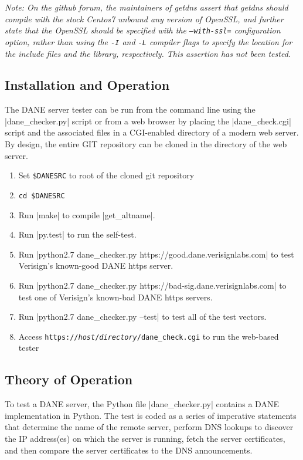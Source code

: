 \documentclass[preprint,3p]{elsarticle}
\begin{document}
\emph{Note: On the github forum, the maintainers of getdns assert that
getdns should compile with the stock Centos7 unbound any version of
OpenSSL, and further state that the OpenSSL should be specified with
the \texttt{--with-ssl=} configuration option, rather than using the
\texttt{-I} and \texttt{-L} compiler flags to specify the location for the include
files and the library, respectively. This assertion has not been tested.}

\subsection{Installation and Operation}

The DANE server tester can be run from the command line using the
|dane_checker.py| script or from a web browser by placing the
|dane_check.cgi| script and the associated files in a
CGI-enabled directory of a modern web server. By design, the entire
GIT repository can be cloned in the directory of the web server.

\begin{enumerate}
\item Set \verb|$DANESRC| to root of the cloned git repository
\item \verb|cd $DANESRC|
\item Run |make| to compile |get_altname|.
\item Run |py.test| to run the self-test.
\item Run |python2.7 dane_checker.py https://good.dane.verisignlabs.com| to test Verisign's known-good
  DANE https server.
\item Run |python2.7 dane_checker.py https://bad-sig.dane.verisignlabs.com| to test one of Verisign's
  known-bad DANE https servers.
\item Run |python2.7 dane_checker.py --test| to test all of the test vectors.
\item Access \texttt{https://\emph{host}/\emph{directory}/dane\_check.cgi} to run
  the web-based tester
\end{enumerate}


\subsection{Theory of Operation}

To test a DANE server, the Python file |dane_checker.py| contains a
DANE implementation in Python. The test is coded as a series of
imperative statements that determine the name of the remote server,
perform DNS lookups to discover the IP address(es) on which the server
is running, fetch the server certificates, and then compare the server
certificates to the DNS announcements. 
\end{document}
